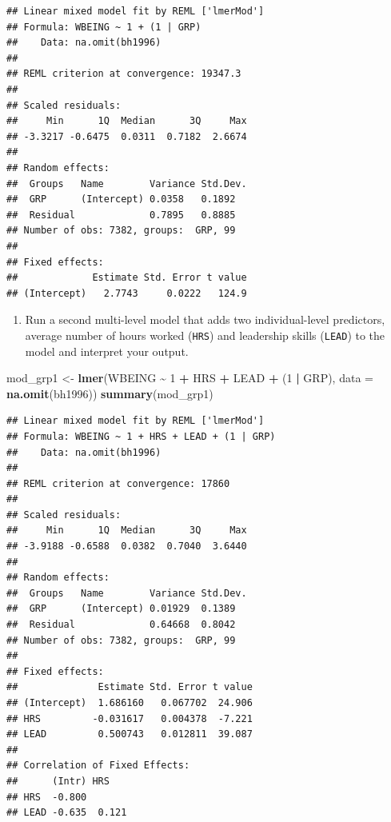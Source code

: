 \documentclass[
]{book}
\newenvironment{Shaded}{\begin{snugshade}}{\end{snugshade}}
\newcommand{\DataTypeTok}[1]{\textcolor[rgb]{0.13,0.29,0.53}{#1}}
\newcommand{\DecValTok}[1]{\textcolor[rgb]{0.00,0.00,0.81}{#1}}
\newcommand{\KeywordTok}[1]{\textcolor[rgb]{0.13,0.29,0.53}{\textbf{#1}}}
\newcommand{\NormalTok}[1]{#1}
\newcommand{\OperatorTok}[1]{\textcolor[rgb]{0.81,0.36,0.00}{\textbf{#1}}}
\newcommand{\StringTok}[1]{\textcolor[rgb]{0.31,0.60,0.02}{#1}}
\providecommand{\tightlist}{%
  \setlength{\itemsep}{0pt}\setlength{\parskip}{0pt}}
\begin{document}
\begin{alert}
\begin{verbatim}
## Linear mixed model fit by REML ['lmerMod']
## Formula: WBEING ~ 1 + (1 | GRP)
##    Data: na.omit(bh1996)
## 
## REML criterion at convergence: 19347.3
## 
## Scaled residuals: 
##     Min      1Q  Median      3Q     Max 
## -3.3217 -0.6475  0.0311  0.7182  2.6674 
## 
## Random effects:
##  Groups   Name        Variance Std.Dev.
##  GRP      (Intercept) 0.0358   0.1892  
##  Residual             0.7895   0.8885  
## Number of obs: 7382, groups:  GRP, 99
## 
## Fixed effects:
##             Estimate Std. Error t value
## (Intercept)   2.7743     0.0222   124.9
\end{verbatim}

\begin{enumerate}
\def\labelenumi{\arabic{enumi}.}
\setcounter{enumi}{2}
\tightlist
\item
  Run a second multi-level model that adds two individual-level predictors, average number of hours worked (\texttt{HRS}) and leadership skills (\texttt{LEAD}) to the model and interpret your output.
\end{enumerate}

\begin{Shaded}
\begin{Highlighting}[]
\NormalTok{  mod\_grp1 \textless{}{-}}\StringTok{ }\KeywordTok{lmer}\NormalTok{(WBEING }\OperatorTok{\textasciitilde{}}\StringTok{ }\DecValTok{1} \OperatorTok{+}\StringTok{ }\NormalTok{HRS }\OperatorTok{+}\StringTok{ }\NormalTok{LEAD }\OperatorTok{+}\StringTok{ }\NormalTok{(}\DecValTok{1} \OperatorTok{|}\StringTok{ }\NormalTok{GRP), }\DataTypeTok{data =} \KeywordTok{na.omit}\NormalTok{(bh1996))}
  \KeywordTok{summary}\NormalTok{(mod\_grp1)}
\end{Highlighting}
\end{Shaded}

\begin{verbatim}
## Linear mixed model fit by REML ['lmerMod']
## Formula: WBEING ~ 1 + HRS + LEAD + (1 | GRP)
##    Data: na.omit(bh1996)
## 
## REML criterion at convergence: 17860
## 
## Scaled residuals: 
##     Min      1Q  Median      3Q     Max 
## -3.9188 -0.6588  0.0382  0.7040  3.6440 
## 
## Random effects:
##  Groups   Name        Variance Std.Dev.
##  GRP      (Intercept) 0.01929  0.1389  
##  Residual             0.64668  0.8042  
## Number of obs: 7382, groups:  GRP, 99
## 
## Fixed effects:
##              Estimate Std. Error t value
## (Intercept)  1.686160   0.067702  24.906
## HRS         -0.031617   0.004378  -7.221
## LEAD         0.500743   0.012811  39.087
## 
## Correlation of Fixed Effects:
##      (Intr) HRS   
## HRS  -0.800       
## LEAD -0.635  0.121
\end{verbatim}


\end{alert}
\end{document}
